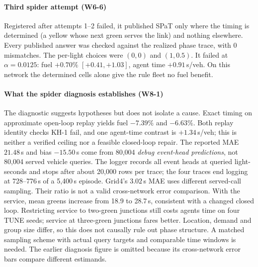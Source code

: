 \paragraph{Third spider attempt (W6-6)} Registered after attempts 1--2 failed, it published SPaT only where the timing is
determined (a yellow whose next green serves the link) and nothing elsewhere. Every published answer was checked against the realized
phase trace, with 0 mismatches. The per-light choices were $(0,0)$ and $(1,0.5)$. It failed at $\alpha=0.0125$: fuel $+0.70\%$
$[+0.41,+1.03]$, agent time $+0.91$\,s/veh. On this network the determined cells alone give the rule fleet no fuel benefit.

\paragraph{What the spider diagnosis establishes (W8-1)}
The diagnostic suggests hypotheses but does not isolate a cause. Exact timing on approximate open-loop replay yields fuel $-7.39\%$ and $-6.63\%$. Both replay identity checks KH-1 fail, and one agent-time contrast is $+1.34$\,s/veh; this is neither a verified ceiling nor a feasible closed-loop repair.
The reported MAE $21.48$\,s and bias $-15.50$\,s come from 80,004 \emph{debug event-head predictions}, not 80,004 served vehicle queries. The logger records all event heads at queried light-seconds and stops after about 20,000 rows per trace; the four traces end logging at 728--776\,s of a 5,400\,s episode. Grid4's $3.02$\,s MAE uses different served-call sampling. Their ratio is not a valid cross-network error comparison.
With the service, mean greens increase from 18.9 to 28.7\,s, consistent with a changed closed loop. Restricting service to two-green junctions still costs agents time on four TUNE seeds; service at three-green junctions fares better. Location, demand and group size differ, so this does not causally rule out phase structure. A matched sampling scheme with actual query targets and comparable time windows is needed. The earlier diagnosis figure is omitted because its cross-network error bars compare different estimands.

